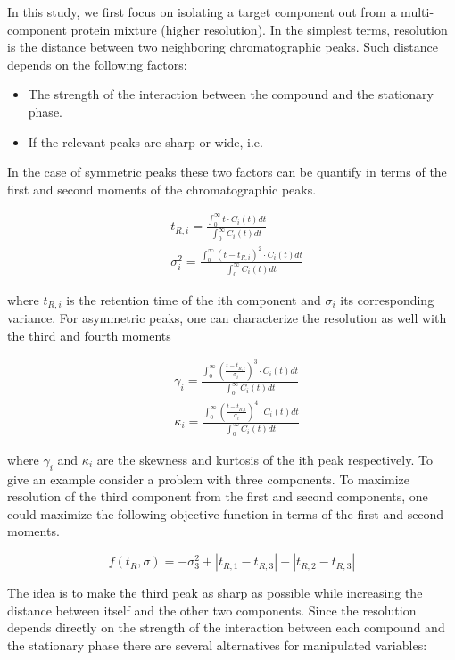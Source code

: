 \documentclass[paper=a4, fontsize=11pt]{scrartcl}
\begin{document}
In this study, we first focus on isolating a target component out from a multi-component protein mixture (higher resolution).  In the simplest terms, resolution is the distance between two neighboring chromatographic peaks. Such distance depends on the following factors:
 
\begin{itemize}
\item The strength of the interaction between the compound and the stationary phase.
\item If the relevant peaks are sharp or wide, i.e.
\end{itemize}

In the case of symmetric peaks these two factors can be quantify in terms of the first and second moments of the chromatographic peaks. 

\begin{align*}
&t_{R,i} = \frac{\int_{0}^{\infty} t \cdot C_i(t)dt}{\int_{0}^{\infty}C_i(t)dt}\\
&\sigma_{i}^2 = \frac{\int_{0}^{\infty} (t-t_{R,i})^2 \cdot C_i(t)dt}{\int_{0}^{\infty}C_i(t)dt}
\end{align*}

where $t_{R,i}$ is the retention time of the ith component and $\sigma_i$ its corresponding variance. For asymmetric peaks, one can characterize the resolution as well with the third and fourth moments

\begin{align*}
&\gamma_{i} = \frac{\int_{0}^{\infty} (\frac{t-t_{R,i}}{\sigma_i})^3 \cdot C_i(t)dt}{\int_{0}^{\infty}C_i(t)dt}\\
&\kappa_{i} = \frac{\int_{0}^{\infty} (\frac{t-t_{R,i}}{\sigma_i})^4 \cdot C_i(t)dt}{\int_{0}^{\infty}C_i(t)dt}
\end{align*}

where $\gamma_i$ and $\kappa_i$ are the skewness and kurtosis of the ith peak respectively. To give an example consider a problem with three components. To maximize resolution of the third component from the first and second components, one could maximize the following objective function in terms of the first and second moments. 

\begin{equation}
f(t_{R},\sigma) = -\sigma_3^{2}+|t_{R,1}-t_{R,3}|+|t_{R,2}-t_{R,3}|  
\end{equation} 

The idea is to make the third peak as sharp as possible while increasing the distance between itself and the other two components. Since the resolution depends directly on the strength of the interaction between each compound and the stationary phase there are several alternatives for manipulated variables:
\end{document}
